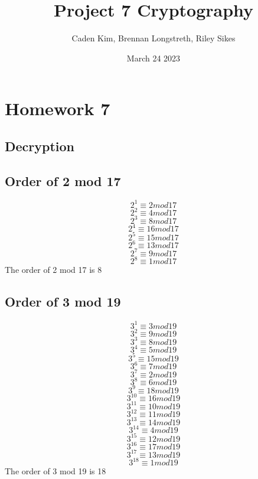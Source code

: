 \documentclass{article}
\title{Project 7 Cryptography}
\author{Caden Kim, Brennan Longstreth, Riley Sikes }
\date{March 24 2023}
\begin{document}
\maketitle

\section{Homework 7}

\subsection{Decryption}

\subsection{Order of 2 mod 17}
$$2^1 \equiv 2 mod 17$$
$$2^2 \equiv 4 mod 17$$
$$2^3 \equiv 8 mod 17$$
$$2^4 \equiv 16 mod 17$$
$$2^5 \equiv 15 mod 17$$
$$2^6 \equiv 13 mod 17$$
$$2^7 \equiv 9 mod 17$$
$$2^8 \equiv 1 mod 17$$
The order of 2 mod 17 is 8

\subsection{Order of 3 mod 19}
$$3^1 \equiv 3 mod 19$$
$$3^2 \equiv 9 mod 19$$
$$3^3 \equiv 8 mod 19$$
$$3^4 \equiv 5 mod 19$$
$$3^5 \equiv 15 mod 19$$
$$3^6 \equiv 7 mod 19$$
$$3^7 \equiv 2 mod 19$$
$$3^8 \equiv 6 mod 19$$
$$3^9 \equiv 18 mod 19$$
$$3^10 \equiv 16 mod 19$$
$$3^11 \equiv 10 mod 19$$
$$3^12 \equiv 11 mod 19$$
$$3^13 \equiv 14 mod 19$$
$$3^14 \equiv 4 mod 19$$
$$3^15 \equiv 12 mod 19$$
$$3^16 \equiv 17 mod 19$$
$$3^17 \equiv 13 mod 19$$
$$3^18 \equiv 1 mod 19$$
The order of 3 mod 19 is 18
\end{document}

